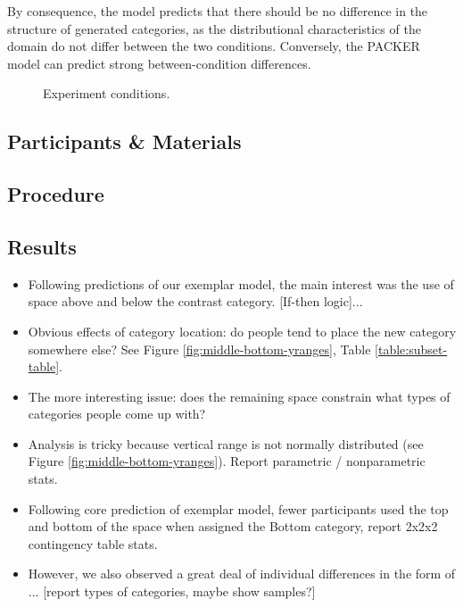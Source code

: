 \documentclass[10pt,letterpaper]{article}
\begin{document}
By consequence, the \citet{jern2013probabilistic} model predicts that there should be no difference in the structure of generated categories, as the distributional characteristics of the domain do not differ between the two conditions. Conversely, the PACKER model can predict strong between-condition differences. %

\begin{figure}
    \begin{center}
    
    \caption{Experiment conditions.}
    \label{fig:middle-bottom-conditions}
    \end{center}
\end{figure}


\subsection{Participants \& Materials}
\subsection{Procedure}
\subsection{Results}

\begin{itemize}
\item Following predictions of our exemplar model, the main interest was the use of space above and below the contrast category. [If-then logic]...
\item Obvious effects of category location: do people tend to place the new category somewhere else? See Figure \ref{fig:middle-bottom-yranges}, Table \ref{table:subset-table}.
\item The more interesting issue: does the remaining space constrain what types of categories people come up with? 
\item Analysis is tricky because vertical range is not normally distributed (see Figure \ref{fig:middle-bottom-yranges}). Report parametric / nonparametric stats.
\item Following core prediction of exemplar model, fewer participants used the top and bottom of the space when assigned the Bottom category, report 2x2x2 contingency table stats.
\item However, we also observed a great deal of individual differences in the form of ... [report types of categories, maybe show samples?]
\end{itemize}
\end{document}
